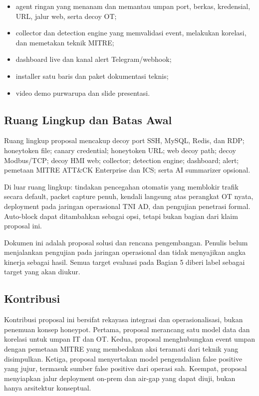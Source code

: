 \documentclass[12pt,a4paper]{article}
\begin{document}
\begin{itemize}[leftmargin=1.2cm,itemsep=2pt,topsep=2pt]
  \item agent ringan yang menanam dan memantau umpan port, berkas, kredensial, URL, jalur web, serta decoy OT;
  \item collector dan detection engine yang memvalidasi event, melakukan korelasi, dan memetakan teknik MITRE;
  \item dashboard live dan kanal alert Telegram/webhook;
  \item installer satu baris dan paket dokumentasi teknis;
  \item video demo purwarupa dan slide presentasi.
\end{itemize}

\subsection{Ruang Lingkup dan Batas Awal}

Ruang lingkup proposal mencakup decoy port SSH, MySQL, Redis, dan RDP; honeytoken file; canary credential; honeytoken URL; web decoy path; decoy Modbus/TCP; decoy HMI web; collector; detection engine; dashboard; alert; pemetaan MITRE ATT\&CK Enterprise dan ICS; serta AI summarizer opsional.

Di luar ruang lingkup: tindakan pencegahan otomatis yang memblokir trafik secara default, packet capture penuh, kendali langsung atas perangkat OT nyata, deployment pada jaringan operasional TNI AD, dan pengujian penetrasi formal. Auto-block dapat ditambahkan sebagai opsi, tetapi bukan bagian dari klaim proposal ini.

Dokumen ini adalah proposal solusi dan rencana pengembangan. Penulis belum menjalankan pengujian pada jaringan operasional dan tidak menyajikan angka kinerja sebagai hasil. Semua target evaluasi pada Bagian 5 diberi label sebagai target yang akan diukur.

\subsection{Kontribusi}

Kontribusi proposal ini bersifat rekayasa integrasi dan operasionalisasi, bukan penemuan konsep honeypot. Pertama, proposal merancang satu model data dan korelasi untuk umpan IT dan OT. Kedua, proposal menghubungkan event umpan dengan pemetaan MITRE yang membedakan aksi teramati dari teknik yang disimpulkan. Ketiga, proposal menyertakan model pengendalian false positive yang jujur, termasuk sumber false positive dari operasi sah. Keempat, proposal menyiapkan jalur deployment on-prem dan air-gap yang dapat diuji, bukan hanya arsitektur konseptual.
\end{document}
